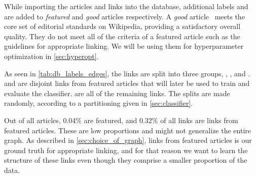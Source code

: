 
While importing the articles and links into the database, additional labels  and  are added to \emph{featured} and \emph{good} articles respectively. A \emph{good} article~\cite{wiki-good-articles} meets the core set of editorial standards on Wikipedia, providing a satisfactory overall quality. They do not meet all of the criteria of a featured article such as the guidelines for appropriate linking. We will be using them for hyperparameter optimization in \cref{sec:hyperopt}.

As seen in \cref{tab:db_labels_edges}, the links are split into three groups, , , and .  and  are disjoint links from featured articles that will later be used to train and evaluate the classifier.  are all of the remaining links. The splits are made randomly, according to a partitioning given in \cref{sec:classifier}.


Out of all articles, 0.04\% are featured, and 0.32\% of all links are links from featured articles. These are low proportions and might not generalize the entire graph. As described in \cref{sec:choice_of_graph}, links from featured articles is our ground truth for appropriate linking, and for that reason we want to learn the structure of these links even though they comprise a smaller proportion of the data.
